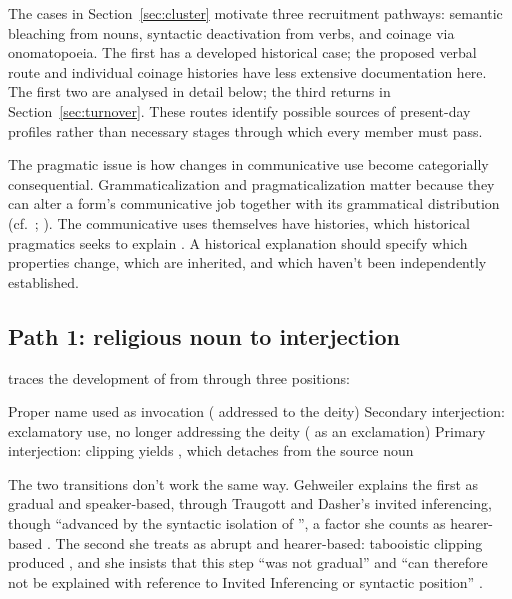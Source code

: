 \documentclass[12pt]{article}
\begin{document}
The cases in Section~\ref{sec:cluster} motivate three recruitment pathways: semantic bleaching from nouns, syntactic deactivation from verbs, and coinage via onomatopoeia. The first has a developed historical case; the proposed verbal route and individual coinage histories have less extensive documentation here. The first two are analysed in detail below; the third returns in Section~\ref{sec:turnover}. These routes identify possible sources of present-day profiles rather than necessary stages through which every member must pass.

The pragmatic issue is how changes in communicative use become categorially consequential. Grammaticalization and pragmaticalization matter because they can alter a form's communicative job together with its grammatical distribution (cf.\ \citealp[26]{TraugottDasher2002}; \citealp[2--3]{heinekuteva2002lexicon}). The communicative uses themselves have histories, which historical pragmatics seeks to explain \citep[cf.][3--5]{juckertaavitsainen2013}. A historical explanation should specify which properties change, which are inherited, and which haven't been independently established.

\subsection{Path 1: religious noun to interjection}\label{sec:path-religious}

\textcite{gehweiler2008} traces the development of  from  through three positions:

\ea\label{ex:bleaching}
  \ea Proper name used as invocation ( addressed to the deity)
  \ex Secondary interjection: exclamatory use, no longer addressing the deity ( as an exclamation)
  \ex Primary interjection: clipping yields , which detaches from the source noun
  \z
\z

The two transitions don't work the same way. Gehweiler explains the first as gradual and speaker-based, through Traugott and Dasher's invited inferencing, though \enquote{advanced by the syntactic isolation of }, a factor she counts as hearer-based \citep[84--85]{gehweiler2008}. The second she treats as abrupt and hearer-based: tabooistic clipping produced , and she insists that this step \enquote{was not gradual} and \enquote{can therefore not be explained with reference to Invited Inferencing or syntactic position} \citep[88]{gehweiler2008}.
\end{document}
